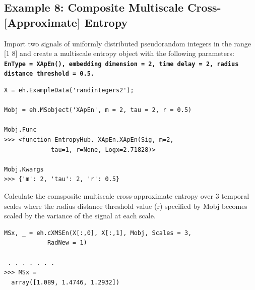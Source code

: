 \documentclass[12pt, a4paper, titlepage, openany]{book}
\begin{document}
\subsection{\normalsize Example 8: \hspace{15mm}Composite Multiscale Cross-[Approximate] Entropy}
\noindent Import two signals of uniformly distributed pseudorandom integers in the range [1 8] and create a multiscale entropy object with the following parameters:\\
\texttt{\textbf{EnType =  XApEn(), embedding dimension = 2, time delay = 2, radius distance threshold = 0.5.}}
\begin{verbatim}
X = eh.ExampleData('randintegers2');

Mobj = eh.MSobject('XApEn', m = 2, tau = 2, r = 0.5)

Mobj.Func
>>> <function EntropyHub._XApEn.XApEn(Sig, m=2,
			 tau=1, r=None, Logx=2.71828)>

Mobj.Kwargs
>>> {'m': 2, 'tau': 2, 'r': 0.5}
\end{verbatim}
Calculate the comsposite multiscale cross-approximate entropy over 3 temporal scales where the radius distance threshold value (r) specified by Mobj becomes scaled by the variance of the signal at each scale.
\begin{verbatim}
MSx, _ = eh.cXMSEn(X[:,0], X[:,1], Mobj, Scales = 3, 
			RadNew = 1)

 . . . . . . .
>>> MSx = 
  array([1.089, 1.4746, 1.2932])
\end{verbatim}


\newpage
\end{document}
